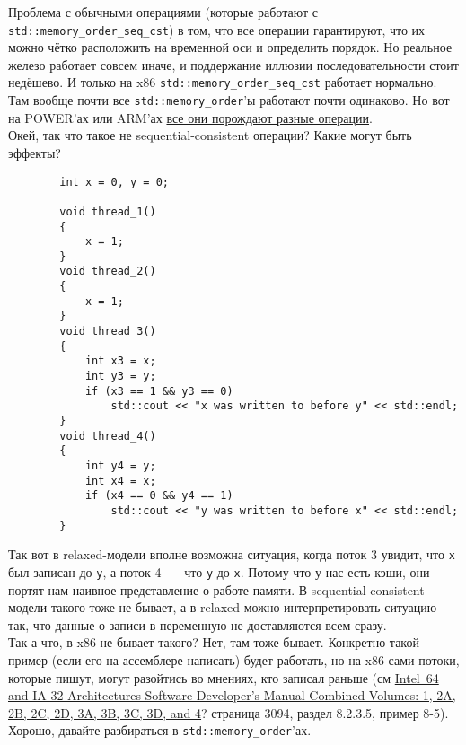 \documentclass{article}
\begin{document}
    Проблема с обычными операциями (которые работают с \texttt{std::memory_order_seq_cst}) в том, что все операции гарантируют, что их можно чётко расположить на временной оси и определить порядок. Но реальное железо работает совсем иначе, и поддержание иллюзии последовательности стоит недёшево. И только на x86 \texttt{std::memory_order_seq_cst} работает нормально. Там вообще почти все \texttt{std::memory_order}'ы работают почти одинаково. Но вот на POWER'ах или ARM'ах \href{https://www.cl.cam.ac.uk/~pes20/cpp/cpp0xmappings.html}{все они порождают разные операции}.\\
    Окей, так что такое не sequential-consistent операции? Какие могут быть эффекты?
    \begin{verbatim}
        int x = 0, y = 0;

        void thread_1()
        {
            x = 1;
        }
        void thread_2()
        {
            x = 1;
        }
        void thread_3()
        {
            int x3 = x;
            int y3 = y;
            if (x3 == 1 && y3 == 0)
                std::cout << "x was written to before y" << std::endl;
        }
        void thread_4()
        {
            int y4 = y;
            int x4 = x;
            if (x4 == 0 && y4 == 1)
                std::cout << "y was written to before x" << std::endl;
        }
    \end{verbatim}
    Так вот в relaxed-модели вполне возможна ситуация, когда поток 3 увидит, что \texttt{x} был записан до \texttt{y}, а поток 4~--- что \texttt{y} до \texttt{x}. Потому что у нас есть кэши, они портят нам наивное представление о работе памяти. В sequential-consistent модели такого тоже не бывает, а в relaxed можно интерпретировать ситуацию так, что данные о записи в переменную не доставляются всем сразу.\\
    Так а что, в x86 не бывает такого? Нет, там тоже бывает. Конкретно такой пример (если его на ассемблере написать) будет работать, но на x86 сами потоки, которые пишут, могут разойтись во мнениях, кто записал раньше (см \href{https://www.intel.com/content/www/us/en/developer/articles/technical/intel-sdm.html}{Intel\textregistered\ 64 and IA-32 Architectures Software Developer's Manual Combined Volumes: 1, 2A, 2B, 2C, 2D, 3A, 3B, 3C, 3D, and 4}? страница 3094, раздел 8.2.3.5, пример 8-5).\\
    Хорошо, давайте разбираться в \texttt{std::memory_order}'ах.
\end{document}
